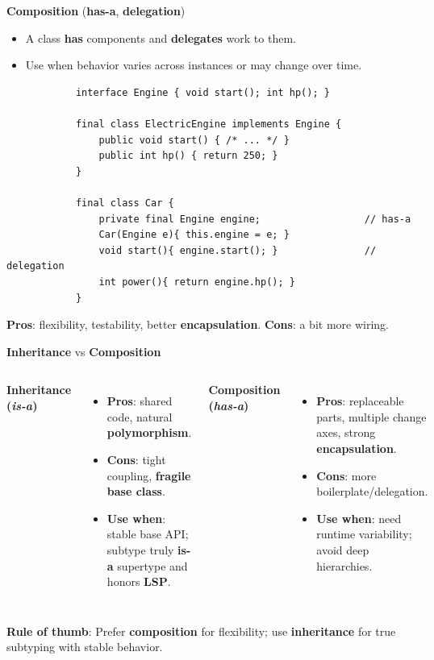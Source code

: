 \documentclass[11pt,aspectratio=169]{beamer}
\begin{document}
	\begin{frame}[fragile]{\textbf{Composition} (\textbf{has-a}, \textbf{delegation})}
		\begin{itemize}
			\item A class \textbf{has} components and \textbf{delegates} work to them.
			\item Use when behavior varies across instances or may change over time.
		\end{itemize}
		\medskip
		\begin{lstlisting}
			interface Engine { void start(); int hp(); }
			
			final class ElectricEngine implements Engine {
				public void start() { /* ... */ }
				public int hp() { return 250; }
			}
			
			final class Car {
				private final Engine engine;                  // has-a
				Car(Engine e){ this.engine = e; }
				void start(){ engine.start(); }               // delegation
				int power(){ return engine.hp(); }
			}
		\end{lstlisting}
		\textbf{Pros}: flexibility, testability, better \textbf{encapsulation}.
		\quad \textbf{Cons}: a bit more wiring.
	\end{frame}
	
	\begin{frame}[fragile]{\textbf{Inheritance} vs \textbf{Composition}}
		\begin{columns}[T,onlytextwidth]
			\textbf{Inheritance (\textit{is-a})}
			\begin{itemize}
				\item \textbf{Pros}: shared code, natural \textbf{polymorphism}.
				\item \textbf{Cons}: tight coupling, \textbf{fragile base class}.
				\item \textbf{Use when}: stable base API; subtype truly \textbf{is-a} supertype and honors \textbf{LSP}.
			\end{itemize}
			
			\textbf{Composition (\textit{has-a})}
			\begin{itemize}
				\item \textbf{Pros}: replaceable parts, multiple change axes, strong \textbf{encapsulation}.
				\item \textbf{Cons}: more boilerplate/delegation.
				\item \textbf{Use when}: need runtime variability; avoid deep hierarchies.
			\end{itemize}
		\end{columns}
		\medskip
		\textbf{Rule of thumb}: Prefer \textbf{composition} for flexibility; use \textbf{inheritance} for true subtyping with stable behavior.
	\end{frame}
	
\end{document}
